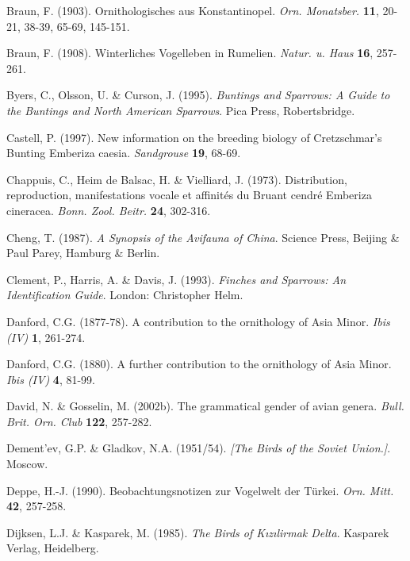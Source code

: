 \documentclass[
  10.5pt,
  a4paper,
  DIV=11,
  numbers=noendperiod,
  twocolumn]{scrreprt}
\newlength{\cslhangindent}
\newenvironment{CSLReferences}[2] %
 {\begin{list}{}{%
  \setlength{\itemindent}{0pt}
  \setlength{\leftmargin}{0pt}
  \setlength{\parsep}{0pt}
  \ifodd #1
   \setlength{\leftmargin}{\cslhangindent}
   \setlength{\itemindent}{-1\cslhangindent}
  \fi
  \setlength{\itemsep}{#2\baselineskip}}}
 {\end{list}}
\begin{document}
\begin{CSLReferences}{1}{1}
Braun, F. (1903). {Ornithologisches aus Konstantinopel}. \emph{Orn.
Monatsber.} \textbf{11}, 20-21, 38-39, 65-69, 145-151.

Braun, F. (1908). {Winterliches Vogelleben in Rumelien}. \emph{Natur. u.
Haus} \textbf{16}, 257-261.

Byers, C., Olsson, U. \& Curson, J. (1995). \emph{{Buntings and
Sparrows: A Guide to the Buntings and North American Sparrows}}. Pica
Press, Robertsbridge.

Castell, P. (1997). {New information on the breeding biology of
Cretzschmar's Bunting {Emberiza caesia}}. \emph{Sandgrouse} \textbf{19},
68-69.

Chappuis, C., Heim de Balsac, H. \& Vielliard, J. (1973). {Distribution,
reproduction, manifestations vocale et affinités du Bruant cendré
{Emberiza cineracea}}. \emph{Bonn. Zool. Beitr.} \textbf{24}, 302-316.

Cheng, T. (1987). \emph{{A Synopsis of the Avifauna of China}}. Science
Press, Beijing \& Paul Parey, Hamburg \& Berlin.

Clement, P., Harris, A. \& Davis, J. (1993). \emph{{Finches and
Sparrows: An Identification Guide}}. London: Christopher Helm.

Danford, C.G. (1877-78). {A contribution to the ornithology of Asia
Minor}. \emph{Ibis (IV)} \textbf{1}, 261-274.

Danford, C.G. (1880). {A further contribution to the ornithology of Asia
Minor}. \emph{Ibis (IV)} \textbf{4}, 81-99.

David, N. \& Gosselin, M. (2002b). {The grammatical gender of avian
genera}. \emph{Bull. Brit. Orn. Club} \textbf{122}, 257-282.

Dement'ev, G.P. \& Gladkov, N.A. (1951/54). \emph{{{[}The Birds of the
Soviet Union.{]}}}. Moscow.

Deppe, H.-J. (1990). {Beobachtungsnotizen zur Vogelwelt der Türkei}.
\emph{Orn. Mitt.} \textbf{42}, 257-258.

Dijksen, L.J. \& Kasparek, M. (1985). \emph{{The Birds of Kızılirmak
Delta}}. Kasparek Verlag, Heidelberg.


\end{CSLReferences}
\end{document}
